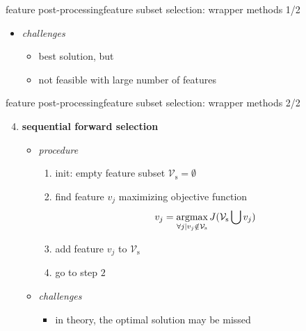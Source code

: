 \begin{frame}{feature post-processing}{feature subset selection: wrapper methods 1/2}
\begin{enumerate}
\begin{itemize}
\begin{itemize}
                                \item   subsets to test: $2^\mathcal{F}$
                            \end{itemize}
                        \item<6->   \textit{challenges}
                            \begin{itemize}
                                \item	best solution, but
                                \item	not feasible with large number of features
                            \end{itemize}
                    \end{itemize}
			\end{enumerate}
		\end{frame}
		\begin{frame}{feature post-processing}{feature subset selection: wrapper methods 2/2}
            \vspace{-2mm}
			\begin{enumerate}
                \setcounter{enumi}{3}
				\item	\textbf{sequential forward selection}
                    \begin{itemize}
                        \item   \textit{procedure}
                            \begin{enumerate}
                                \item	init: empty feature subset $\mathcal{V}_\mathrm{s} = {\emptyset}$
                                \item<2->	find feature $v_j$ maximizing objective function
                                            \begin{equation*}
                                                v_j = \operatorname*{argmax}_{\forall j | v_j \notin \mathcal{V}_\mathrm{s}} J({\mathcal{V}_\mathrm{s}} \bigcup v_j) 
                                            \end{equation*}
                                \item<3->	add feature $v_j$ to $\mathcal{V}_\mathrm{s}$ 
                                \item<4->	go to step $2$
                            \end{enumerate}
                        \item<5->   \textit{challenges}
                            \begin{itemize}
                                \item	in theory, the optimal solution may be missed
                            \end{itemize}
                    \end{itemize}
					

\end{enumerate}
\end{frame}
